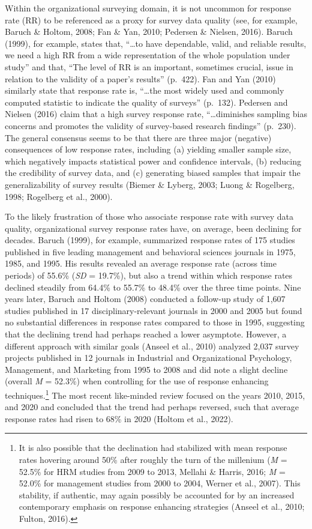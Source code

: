 \documentclass[
  man,mask]{apa7}
\begin{document}
Within the organizational surveying domain, it is not uncommon for response rate (RR) to be referenced as a proxy for survey data quality (see, for example, Baruch \& Holtom, 2008; Fan \& Yan, 2010; Pedersen \& Nielsen, 2016). Baruch (1999), for example, states that, ``\ldots to have dependable, valid, and reliable results, we need a high RR from a wide representation of the whole population under study'' and that, ``The level of RR is an important, sometimes crucial, issue in relation to the validity of a paper's results'' (p.~422). Fan and Yan (2010) similarly state that response rate is, ``\ldots the most widely used and commonly computed statistic to indicate the quality of surveys'' (p.~132). Pedersen and Nielsen (2016) claim that a high survey response rate, ``\ldots diminishes sampling bias concerns and promotes the validity of survey-based research findings'' (p.~230). The general consensus seems to be that there are three major (negative) consequences of low response rates, including (a) yielding smaller sample size, which negatively impacts statistical power and confidence intervals, (b) reducing the credibility of survey data, and (c) generating biased samples that impair the generalizability of survey results (Biemer \& Lyberg, 2003; Luong \& Rogelberg, 1998; Rogelberg et al., 2000).

To the likely frustration of those who associate response rate with survey data quality, organizational survey response rates have, on average, been declining for decades. Baruch (1999), for example, summarized response rates of 175 studies published in five leading management and behavioral sciences journals in 1975, 1985, and 1995. His results revealed an average response rate (across time periods) of 55.6\% (\emph{SD} = 19.7\%), but also a trend within which response rates declined steadily from 64.4\% to 55.7\% to 48.4\% over the three time points. Nine years later, Baruch and Holtom (2008) conducted a follow-up study of 1,607 studies published in 17 disciplinary-relevant journals in 2000 and 2005 but found no substantial differences in response rates compared to those in 1995, suggesting that the declining trend had perhaps reached a lower asymptote. However, a different approach with similar goals (Anseel et al., 2010) analyzed 2,037 survey projects published in 12 journals in Industrial and Organizational Psychology, Management, and Marketing from 1995 to 2008 and did note a slight decline (overall \emph{M} = 52.3\%) when controlling for the use of response enhancing techniques.\footnote{It is also possible that the declination had stabilized with mean response rates hovering around 50\% after roughly the turn of the millenium (\emph{M} = 52.5\% for HRM studies from 2009 to 2013, Mellahi \& Harris, 2016; \emph{M} = 52.0\% for management studies from 2000 to 2004, Werner et al., 2007). This stability, if authentic, may again possibly be accounted for by an increased contemporary emphasis on response enhancing strategies (Anseel et al., 2010; Fulton, 2016).} The most recent like-minded review focused on the years 2010, 2015, and 2020 and concluded that the trend had perhaps reversed, such that average response rates had risen to 68\% in 2020 (Holtom et al., 2022).
\end{document}
